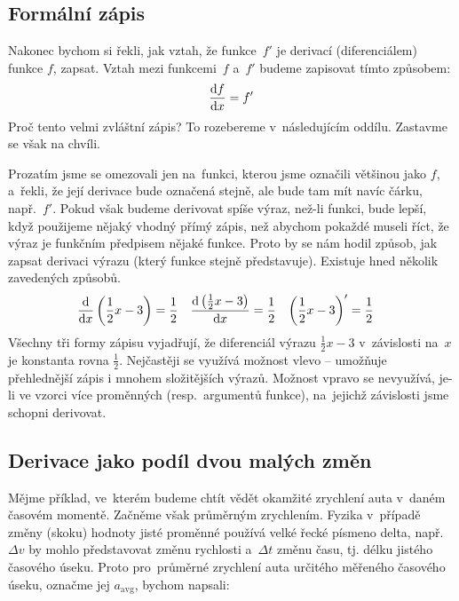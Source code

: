 \subsection{Formální zápis}
\label{subsec:derivace-formalni-zapis}

Nakonec bychom si řekli, jak vztah, že funkce~$f'$ je derivací (diferenciálem) funkce
$f$, zapsat. Vztah mezi funkcemi~$f$ a~$f'$ budeme zapisovat tímto způsobem:
\begin{equation*}
    \frac{\mathrm{d} f}{\mathrm{d} x} = f'
\end{equation*}
Proč tento velmi zvláštní zápis? To rozebereme v~následujícím oddílu. Zastavme se
však na chvíli.

Prozatím jsme se omezovali jen na~funkci, kterou jsme označili většinou jako $f$,
a~řekli, že její derivace bude označená stejně, ale bude tam mít navíc čárku,
např.~$f'$. Pokud však budeme derivovat spíše výraz, než-li funkci, bude lepší, když
použijeme nějaký vhodný přímý zápis, než abychom pokaždé museli říct, že výraz je
funkčním předpisem nějaké funkce. Proto by se nám hodil způsob, jak zapsat derivaci
výrazu (který funkce stejně představuje). Existuje hned několik zavedených způsobů.
\begin{align*}
    \frac{\mathrm{d}}{\mathrm{d} x} \left( \frac12 x - 3 \right) &= \frac12 &
    \frac{\mathrm{d} \left( \frac12 x - 3 \right)}{\mathrm{d} x}  &= \frac12 &
    \left( \frac12 x - 3 \right)'               &= \frac12
\end{align*}
Všechny tři formy zápisu vyjadřují, že diferenciál výrazu ${\frac12 x - 3}$
v~závislosti na~$x$ je konstanta rovna $\frac12$. Nejčastěji se využívá možnost vlevo
-- umožňuje přehlednější zápis i mnohem složitějších výrazů. Možnost vpravo se
nevyužívá, je-li ve vzorci více proměnných (resp.\ argumentů funkce), na~jejichž
závislosti jsme schopni derivovat.

\subsection{Derivace jako podíl dvou malých změn}
\label{subsec:derivace-jako-podil}

Mějme příklad, ve~kterém budeme chtít vědět okamžité zrychlení auta v~daném časovém
momentě. Začněme však průměrným zrychlením. Fyzika v~případě změny (skoku) hodnoty
jisté proměnné používá velké řecké písmeno delta, např. $\Delta v$ by mohlo
představovat změnu rychlosti a~$\Delta t$ změnu času, tj. délku jistého časového
úseku. Proto pro~průměrné zrychlení auta určitého měřeného časového úseku, označme
jej $a_{\text{avg}}$,  bychom napsali:

